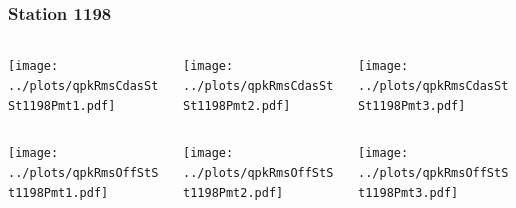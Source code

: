 \documentclass[aspectratio=169]{beamer}
\begin{document}
\begin{frame} 
  \frametitle{Station 1198}
  \begin{center}
    \begin{columns}
      \begin{column}{0.33\textwidth}
        \texttt{[image: ../plots/qpkRmsCdasStSt1198Pmt1.pdf]}
      \end{column}
      \begin{column}{0.33\textwidth}
        \texttt{[image: ../plots/qpkRmsCdasStSt1198Pmt2.pdf]}
      \end{column}
      \begin{column}{0.33\textwidth}
        \texttt{[image: ../plots/qpkRmsCdasStSt1198Pmt3.pdf]}
      \end{column}
    \end{columns}
  \end{center}

  \begin{center}
    \begin{columns}
      \begin{column}{0.33\textwidth}
        \texttt{[image: ../plots/qpkRmsOffStSt1198Pmt1.pdf]}
      \end{column}
      \begin{column}{0.33\textwidth}
        \texttt{[image: ../plots/qpkRmsOffStSt1198Pmt2.pdf]}
      \end{column}
      \begin{column}{0.33\textwidth}
        \texttt{[image: ../plots/qpkRmsOffStSt1198Pmt3.pdf]}
      \end{column}
    \end{columns}
  \end{center}
\end{frame}
\end{document}
